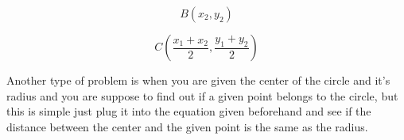 \documentclass[a4paper, 15pt]{article}
\begin{document}
			\begin{equation*}
				B(x_2, y_2)
			\end{equation*}
			
			\begin{equation*}
				C(\frac{x_1 + x_2}{2}, \frac{y_1 + y_2}{2})
			\end{equation*}

			\begin{center}
			\end{center}
			
			\hline \vspace{3mm}
			\noindent Another type of problem is when you are given the center of the circle and it's radius and you are suppose to find out if a given point belongs to the circle, but this is simple just plug it into the equation given beforehand and see
			if the distance between the center and the given point is the same as the radius.
			
\end{document}
